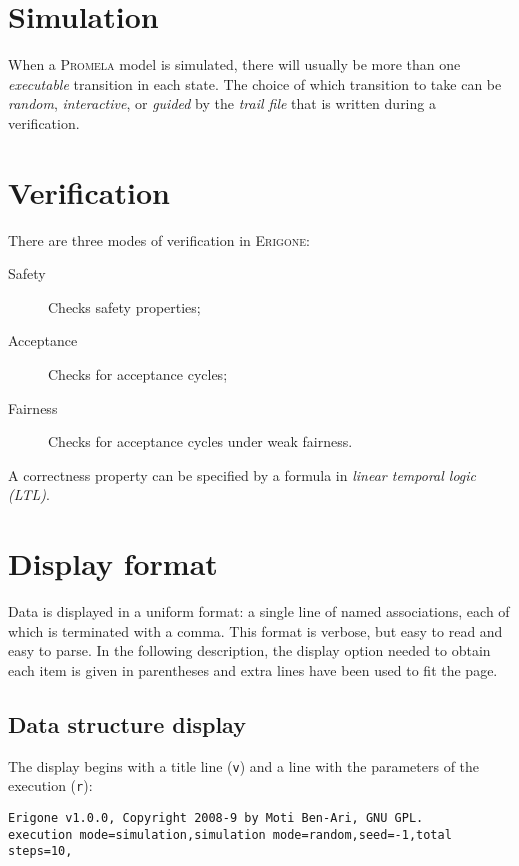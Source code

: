 \documentclass[11pt]{article}
\newcommand*{\prg}{\textsc{Erigone}}
\newcommand*{\prm}{\textsc{Promela}}
\newcommand*{\p}[1]{\texttt{#1}}
\begin{document}
\section{Simulation}
When a \prm{} model is simulated, there will usually be more than one
\emph{executable} transition in each state. The choice of which
transition to take can be \emph{random}, \emph{interactive}, or
\emph{guided} by the \emph{trail file} that is written during a
verification.

\section{Verification}
There are three modes of verification in \prg{}:
\begin{description}
\item[Safety] Checks safety properties;
\item[Acceptance] Checks for acceptance cycles;
\item[Fairness] Checks for acceptance cycles under weak fairness.
\end{description}
A correctness property can be specified by a formula in \emph{linear
temporal logic (LTL)}.

\section{Display format}

Data is displayed in a uniform format: a single line of named
associations, each of which is terminated with a comma. This format is
verbose, but easy to read and easy to parse. In the following
description, the display option needed to obtain each item is given in
parentheses and extra lines have been used to fit the page.

\subsection{Data structure display}

The display begins with a title line (\p{v}) and a line
with the parameters of the execution (\p{r}):

\begin{footnotesize}
\begin{verbatim}
Erigone v1.0.0, Copyright 2008-9 by Moti Ben-Ari, GNU GPL.
execution mode=simulation,simulation mode=random,seed=-1,total steps=10,
\end{verbatim}
\end{footnotesize}
\end{document}
